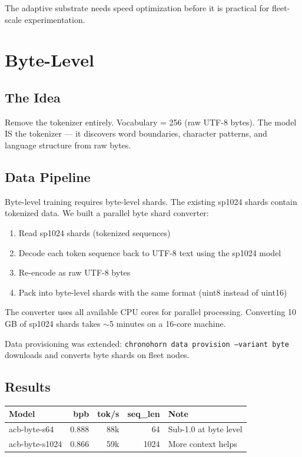 \documentclass[11pt,a4paper]{report}
\begin{document}
The adaptive substrate needs speed optimization before it is practical for fleet-scale experimentation.


\chapter{Byte-Level}

\section{The Idea}

Remove the tokenizer entirely. Vocabulary = 256 (raw UTF-8 bytes). The model IS the tokenizer --- it discovers word boundaries, character patterns, and language structure from raw bytes.

\section{Data Pipeline}

Byte-level training requires byte-level shards. The existing sp1024 shards contain tokenized data. We built a parallel byte shard converter:

\begin{enumerate}[nosep]
\item Read sp1024 shards (tokenized sequences)
\item Decode each token sequence back to UTF-8 text using the sp1024 model
\item Re-encode as raw UTF-8 bytes
\item Pack into byte-level shards with the same format (uint8 instead of uint16)
\end{enumerate}

The converter uses all available CPU cores for parallel processing. Converting 10 GB of sp1024 shards takes $\sim$5 minutes on a 16-core machine.

Data provisioning was extended: \texttt{chronohorn data provision --variant byte} downloads and converts byte shards on fleet nodes.

\section{Results}

\begin{center}
\begin{tabular}{lrrrl}
\toprule
Model & bpb & tok/s & seq\_len & Note \\
\midrule
acb-byte-s64 & 0.888 & 88k & 64 & Sub-1.0 at byte level \\
acb-byte-s1024 & 0.866 & 59k & 1024 & More context helps \\
\bottomrule
\end{tabular}
\end{center}
\end{document}
